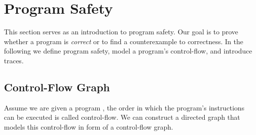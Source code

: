 \section{Program Safety}
This section serves as an introduction to program safety. Our goal is to prove whether a program is \textsl{correct} or to find a counterexample to correctness. In the following we define program safety, model a program's control-flow, and introduce traces.
\subsection{Control-Flow Graph}
 Assume we are given a program \prg, the order in which the program's instructions can be executed is called control-flow. We can construct a directed graph that models this control-flow in form of a control-flow graph.
 
